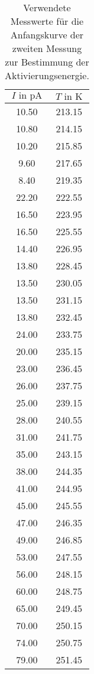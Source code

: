 \begin{table}
  \centering
  \caption{Verwendete Messwerte für die Anfangskurve der zweiten Messung zur Bestimmung der Aktivierungsenergie.}
  \label{tab:linfit2}
  \begin{tabular}{c c}
    \toprule
    $I \text{ in } \si{\pico\ampere}$ & $ T \text{ in } \si{\kelvin} $ \\
    \midrule
    10.50 & 213.15\\
    10.80 & 214.15\\
    10.20 & 215.85\\
     9.60 & 217.65\\
     8.40 & 219.35\\
    22.20 & 222.55\\
    16.50 & 223.95\\
    16.50 & 225.55\\
    14.40 & 226.95\\
    13.80 & 228.45\\
    13.50 & 230.05\\
    13.50 & 231.15\\
    13.80 & 232.45\\
    24.00 & 233.75\\
    20.00 & 235.15\\
    23.00 & 236.45\\
    26.00 & 237.75\\
    25.00 & 239.15\\
    28.00 & 240.55\\
    31.00 & 241.75\\
    35.00 & 243.15\\
    38.00 & 244.35\\
    41.00 & 244.95\\
    45.00 & 245.55\\
    47.00 & 246.35\\
    49.00 & 246.85\\
    53.00 & 247.55\\
    56.00 & 248.15\\
    60.00 & 248.75\\
    65.00 & 249.45\\
    70.00 & 250.15\\
    74.00 & 250.75\\
    79.00 & 251.45\\
    \bottomrule
  \end{tabular}
\end{table}

\FloatBarrier


